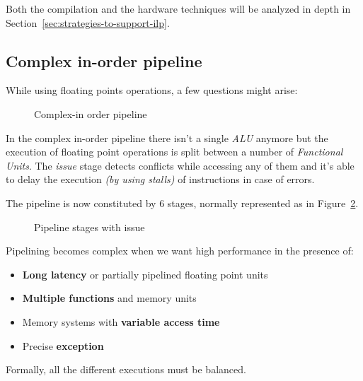 \documentclass[english]{article}
\begin{document}
Both the compilation and the hardware techniques will be analyzed in depth in Section~\ref{sec:strategies-to-support-ilp}.

\subsection{Complex in-order pipeline}

While using floating points operations, a few questions might arise:


\begin{figure}[htbp]
  \bigskip
  \centering
  \caption{Complex-in order pipeline}
  \label{fig:complex-in-order-pipeline}
  \bigskip
\end{figure}

In the complex in-order pipeline there isn't a single \textit{ALU} anymore but the execution of floating point operations is split between a number of \textit{Functional Units}.
The \textit{issue} stage detects conflicts while accessing any of them and it's able to delay the execution \textit{(by using stalls)} of instructions in case of errors.

The pipeline is now constituted by \(6\) stages, normally represented as in Figure~\ref{fig:mips-pipeline-stages-issue}.

\begin{figure}[htbp]
  \bigskip
  \centering
  \caption{Pipeline stages with issue}
  \label{fig:mips-pipeline-stages-issue}
  \bigskip
\end{figure}

Pipelining becomes complex when we want high performance in the presence of:

\begin{itemize}
  \item \textbf{Long latency} or partially pipelined floating point units
  \item \textbf{Multiple functions} and memory units
  \item Memory systems with \textbf{variable access time}
  \item Precise \textbf{exception}
\end{itemize}

Formally, all the different executions must be balanced.
\end{document}
